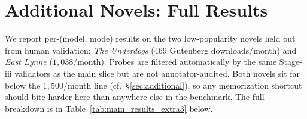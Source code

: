 \documentclass{llmxive}
\begin{document}
\section{Additional Novels: Full Results\label{app:extra3-results}}

We report per-(model, mode) results on the two low-popularity novels held out from human validation: \emph{The Underdogs} ($469$ Gutenberg downloads/month) and \emph{East Lynne} ($1{,}038$/month). Probes are filtered automatically by the same Stage-iii validators as the main slice but are not annotator-audited. Both novels sit far below the $1{,}500$/month line (cf.\ \S\ref{sec:additional}), so any memorization shortcut should bite harder here than anywhere else in the benchmark. The full breakdown is in Table~\ref{tab:main_results_extra3} below.
\end{document}
